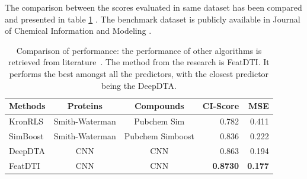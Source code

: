 The comparison between the scores evaluated in same dataset has been compared and presented in table \ref{table:results_comparison} \citep{ozturk2018deepdta}. The benchmark dataset is publicly available in Journal of Chemical Information and Modeling \citep{Tang2013,He2017}.
\begin{table}[H] 
    \centering
    \caption[Results Comparison]{Comparison of performance: the performance of other algorithms is retrieved from literature~\citep{ozturk2018deepdta}. The method from the research is FeatDTI. It performs the best amongst all the predictors, with the closest predictor being the DeepDTA.}
    \label {table:results_comparison}
    \begin{tabular}{|l|c|c|r|r|}
        \hline
        
        Methods & Proteins & Compounds & CI-Score & MSE \\ \hline
        KronRLS & Smith-Waterman & Pubchem Sim & 0.782 & 0.411 \\ \hline
        SimBoost & Smith-Waterman & Pubchem Simboost & 0.836 & 0.222 \\ \hline
        DeepDTA & CNN & CNN & 0.863 & 0.194 \\ \hline
        FeatDTI & CNN & CNN & \textbf{0.8730} & \textbf{0.177} \\ \hline
        
        \end{tabular}
\end{table}

